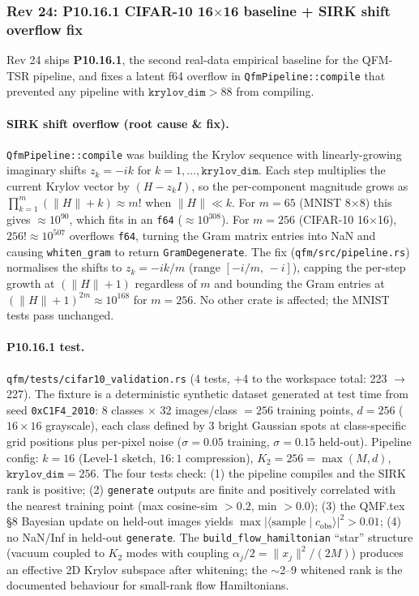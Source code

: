 \documentclass[11pt, a4paper]{article}
\begin{document}
\subsubsection*{Rev 24: P10.16.1 CIFAR-10 16$\times$16 baseline + SIRK shift overflow fix}

Rev 24 ships \textbf{P10.16.1}, the second real-data empirical
baseline for the QFM-TSR pipeline, and fixes a latent f64 overflow
in \texttt{QfmPipeline::compile} that prevented any pipeline with
$\texttt{krylov\_dim} > 88$ from compiling.

\paragraph{SIRK shift overflow (root cause \& fix).}
\texttt{QfmPipeline::compile} was building the Krylov sequence with
linearly-growing imaginary shifts $z_k = -ik$ for
$k = 1, \ldots, \texttt{krylov\_dim}$.  Each step multiplies the
current Krylov vector by $(H - z_k I)$, so the per-component
magnitude grows as
$\prod_{k=1}^{m}(\|H\|+k) \approx m!$ when $\|H\| \ll k$.
For $m = 65$ (MNIST 8$\times$8) this gives $\approx 10^{90}$, which
fits in an \texttt{f64} ($\approx 10^{308}$).  For $m = 256$
(CIFAR-10 16$\times$16), $256!\approx 10^{507}$ overflows
\texttt{f64}, turning the Gram matrix entries into NaN and causing
\texttt{whiten\_gram} to return \texttt{GramDegenerate}.  The fix
(\texttt{qfm/src/pipeline.rs}) normalises the shifts to
$z_k = -ik/m$ (range $[-i/m,\, -i]$), capping the per-step growth
at $(\|H\|+1)$ regardless of $m$ and bounding the Gram entries at
$(\|H\|+1)^{2m} \approx 10^{168}$ for $m=256$.  No other crate is
affected; the MNIST tests pass unchanged.

\paragraph{P10.16.1 test.}
\texttt{qfm/tests/cifar10\_validation.rs} (4 tests, +4 to the
workspace total: 223 $\to$ 227).  The fixture is a deterministic
synthetic dataset generated at test time from seed
\texttt{0xC1F4\_2010}: 8 classes $\times$ 32 images/class $= 256$
training points, $d = 256$ ($16\times 16$ grayscale), each class
defined by 3 bright Gaussian spots at class-specific grid
positions plus per-pixel noise ($\sigma=0.05$ training,
$\sigma=0.15$ held-out).  Pipeline config: $k=16$ (Level-1
sketch, $16{:}1$ compression), $K_2 = 256 = \max(M,d)$,
$\texttt{krylov\_dim} = 256$.  The four tests check: (1) the
pipeline compiles and the SIRK rank is positive; (2)
\texttt{generate} outputs are finite and positively correlated
with the nearest training point (max cosine-sim $>0.2$, min
$>0.0$); (3) the QMF.tex \S8 Bayesian update on held-out images
yields $\max|\langle\text{sample}\mid c_{\text{obs}}\rangle|^2
> 0.01$; (4) no NaN/Inf in held-out \texttt{generate}.  The
\texttt{build\_flow\_hamiltonian} ``star'' structure (vacuum
coupled to $K_2$ modes with coupling $\alpha_j/2 = \|x_j\|^2/(2M)$)
produces an effective 2D Krylov subspace after whitening; the
$\sim$2--9 whitened rank is the documented behaviour for
small-rank flow Hamiltonians.
\end{document}
